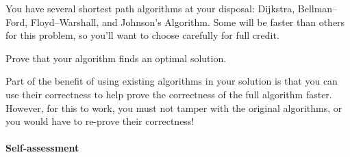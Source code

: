 \documentclass{ks-pset}
\begin{document}
\begin{problem}
\begin{subproblems}
      \begin{note}
        You have several shortest path algorithms at your disposal: Dijkstra,
        Bellman--Ford, Floyd--Warshall, and Johnson's Algorithm. Some will be
        faster than others for this problem, so you'll want to choose carefully
        for full credit.
      \end{note}

    \item Prove that your algorithm finds an optimal solution.

      \begin{note}
        Part of the benefit of using existing algorithms in your solution is
        that you can use their correctness to help prove the correctness of the
        full algorithm faster. However, for this to work, you must not tamper
        with the original algorithms, or you would have to re-prove their
        correctness!
      \end{note}

  \end{subproblems}

\end{problem}

\begin{solution}

  \paragraph{Self-assessment}
\end{solution}
\end{document}
